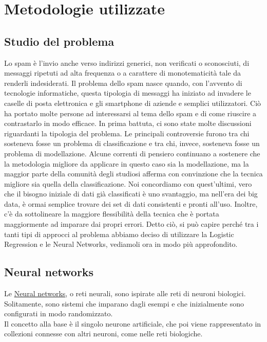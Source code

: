 \section{Metodologie utilizzate}

\subsection{Studio del problema}
Lo spam è l'invio anche verso indirizzi generici, non verificati o sconosciuti, di messaggi ripetuti ad alta frequenza o a carattere di monotematicità tale da renderli indesiderati. Il problema dello spam nasce quando, con l'avvento di tecnologie informatiche, questa tipologia di messaggi ha iniziato ad invadere le caselle di posta elettronica e gli smartphone di aziende e semplici utilizzatori. Ciò ha portato molte persone ad interessarsi al tema dello spam e di come riuscire a contrastarlo in modo efficace.
\newline
In prima battuta, ci sono state molte discussioni riguardanti la tipologia del problema. Le principali controversie furono tra chi sosteneva fosse un problema di classificazione e tra chi, invece, sosteneva fosse un problema di modellazione.
Alcune correnti di pensiero continuano a sostenere che la metodologia migliore da applicare in questo caso sia la modellazione, ma la maggior parte della comunità degli studiosi afferma con convinzione che la tecnica migliore sia quella della classificazione. Noi concordiamo con quest'ultimi, vero che il bisogno iniziale di dati già classificati è uno svantaggio, ma nell'era dei big data, è ormai semplice trovare dei set di dati consistenti e pronti all'uso. Inoltre, c'è da sottolineare la maggiore flessibilità della tecnica che è portata maggiormente ad imparare dai propri errori.
\newline
Detto ciò, si può capire perché tra i tanti tipi di approcci al problema abbiamo deciso di utilizzare la Logistic Regression e le Neural Networks, vediamoli ora in modo più approfondito.
\subsection{Neural networks}
Le \href{https://en.wikipedia.org/wiki/Neural_network}{Neural networks}, o reti neurali, sono ispirate alle reti di neuroni biologici. Solitamente, sono sistemi che imparano dagli esempi e che inizialmente sono configurati in modo randomizzato.\\
Il concetto alla base è il singolo neurone artificiale, che poi viene rappresentato in collezioni connesse con altri neuroni, come nelle reti biologiche.


